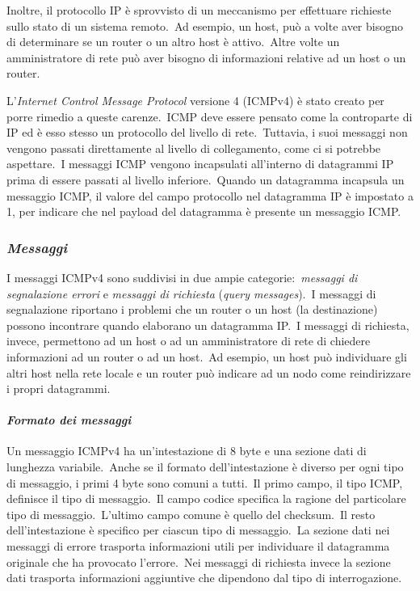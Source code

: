 Inoltre, il protocollo IP è sprovvisto di un meccanismo per effettuare richieste sullo stato di un sistema remoto.\
Ad esempio, un host, può a volte aver bisogno di determinare se un router o un altro host è attivo.\
Altre volte un amministratore di rete può aver bisogno di informazioni relative ad un host o un router.

L'\emph{Internet Control Message Protocol} versione 4 (ICMPv4) è stato creato per porre rimedio a queste carenze.\
ICMP deve essere pensato come la controparte di IP ed è esso stesso un protocollo del livello di rete.\
Tuttavia, i suoi messaggi non vengono passati direttamente al livello di collegamento, come ci si potrebbe aspettare.\
I messaggi ICMP vengono incapsulati all'interno di datagrammi IP prima di essere passati al livello inferiore.\
Quando un datagramma incapsula un messaggio ICMP, il valore del campo protocollo nel datagramma IP è impostato a 1, per indicare che nel payload del datagramma è presente un messaggio ICMP.

\subsubsection{\emph{Messaggi}}

I messaggi ICMPv4 sono suddivisi in due ampie categorie:\ \emph{messaggi di segnalazione errori} e \emph{messaggi di richiesta} (\emph{query messages}).\
I messaggi di segnalazione riportano i problemi che un router o un host (la destinazione) possono incontrare quando elaborano un datagramma IP.\
I messaggi di richiesta, invece, permettono ad un host o ad un amministratore di rete di chiedere informazioni ad un router o ad un host.\
Ad esempio, un host può individuare gli altri host nella rete locale e un router può indicare ad un nodo come reindirizzare i propri datagrammi.

\paragraph{\emph{Formato dei messaggi}}

Un messaggio ICMPv4 ha un'intestazione di 8 byte e una sezione dati di lunghezza variabile.\
Anche se il formato dell'intestazione è diverso per ogni tipo di messaggio, i primi 4 byte sono comuni a tutti.\
Il primo campo, il tipo ICMP, definisce il tipo di messaggio.\
Il campo codice specifica la ragione del particolare tipo di messaggio.\
L'ultimo campo comune è quello del checksum.\
Il resto dell'intestazione è specifico per ciascun tipo di messaggio.\
La sezione dati nei messaggi di errore trasporta informazioni utili per individuare il datagramma originale che ha provocato l'errore.\
Nei messaggi di richiesta invece la sezione dati trasporta informazioni aggiuntive che dipendono dal tipo di interrogazione.

